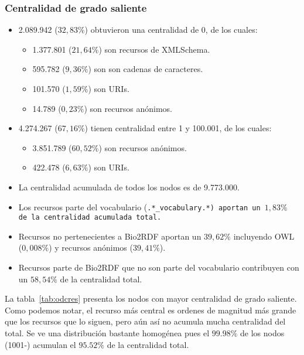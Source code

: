 \subsubsection{Centralidad de grado saliente}
\begin{itemize}
  \item 2.089.942 ($32,83\%$) obtuvieron una centralidad de 0, de los cuales:
    \begin{itemize}
      \item 1.377.801 ($21,64\%$) son recursos de XMLSchema.
      \item 595.782 ($9,36\%$) son son cadenas de caracteres.
      \item 101.570 ($1,59\%$) son URIs.
      \item 14.789 ($0,23\%$) son recursos anónimos.
    \end{itemize}
  \item
    4.274.267 ($67,16\%$) tienen centralidad entre 1 y 100.001, de los cuales:
    \begin{itemize}
      \item 3.851.789 ($60,52\%$) son recursos anónimos.
      \item 422.478 ($6,63\%$) son URIs.
    \end{itemize}
  \item La centralidad acumulada de todos los nodos es de 9.773.000.
  \item 
    Los recursos parte del vocabulario (\tt{.*\_vocabulary.*}) aportan un 
    $1,83\%$ de la centralidad acumulada total.
  \item
    Recursos no pertenecientes a Bio2RDF aportan un $39,62\%$ incluyendo OWL 
    ($0,008\%$) y recursos anónimos ($39,41\%$).
  \item 
    Recursos parte de Bio2RDF que no son parte del vocabulario contribuyen con
    un $58,54\%$ de la centralidad total.
\end{itemize}

La tabla~\ref{tab:odcres} presenta los nodos con mayor centralidad de grado
saliente.
Como podemos notar, el recurso más central es ordenes de magnitud más grande
que los recursos que lo siguen, pero aún así no acumula mucha centralidad del
total.
Se ve una distribución bastante homogénea pues el $99.98\%$ de los nodos (1001-)
acumulan el $95.52\%$ de la centralidad total.

